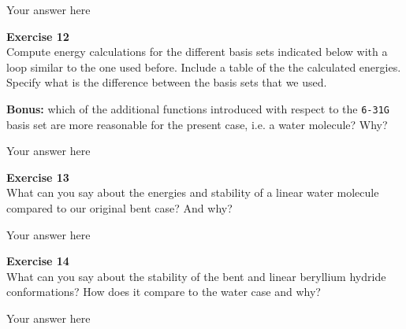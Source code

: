 \documentclass{article}
\begin{document}
Your answer here

\begin{mdframed}
\textbf{Exercise 12}\\
Compute energy calculations for the different basis sets indicated below with a loop similar to the one used before.  Include a table of the the calculated energies. Specify what is the difference between the basis sets that we used.

\textbf{Bonus:} which of the additional functions introduced with respect to the \texttt{6-31G} basis set are more reasonable for the present case, i.e. a water molecule? Why?
\end{mdframed}

Your answer here

\begin{mdframed}
\textbf{Exercise 13}\\
What can you say about the energies and stability of a linear water molecule compared to our original bent case? And why?
\end{mdframed}

Your answer here

\begin{mdframed}
\textbf{Exercise 14}\\
What can you say about the stability of the bent and linear beryllium hydride conformations? How does it compare to the water case and why?
\end{mdframed}

Your answer here
\end{document}
